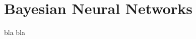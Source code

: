 %
%
%

\chapter{Bayesian Neural Networks}\label{chap:bnn}
bla bla
\enlargethispage{2ex}
\vspace*{-2pt}

\enlargethispage{2ex}


%

